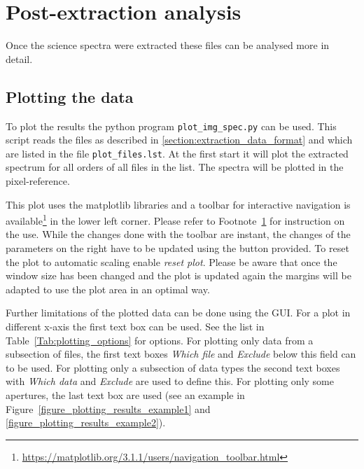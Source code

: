\documentclass[10pt,a4paper]{article}
\begin{document}

\newpage
\section{Post-extraction analysis}

\noindent Once the science spectra were extracted these files can be analysed more in detail. 

\subsection{Plotting the data}
\label{Section:Plotting_extracted_files}
To plot the results the python program \verb|plot_img_spec.py| can be used. This script reads the files as described in \ref{section:extraction_data_format} and which are listed in the file \verb|plot_files.lst|. At the first start it will plot the extracted spectrum for all orders of all files in the list. The spectra will be plotted in the pixel-reference.

This plot uses the matplotlib libraries and a toolbar for interactive navigation is available\footnote{\label{Footnote:matplotlib_toolbar} \url{https://matplotlib.org/3.1.1/users/navigation_toolbar.html}} in the lower left corner. Please refer to Footnote~\ref{Footnote:matplotlib_toolbar} for instruction on the use. While the changes done with the toolbar are instant, the changes of the parameters on the right have to be updated using the button provided. To reset the plot to automatic scaling enable \textit{reset plot}. Please be aware that once the window size has been changed and the plot is updated again the margins will be adapted to use the plot area in an optimal way.

Further limitations of the plotted data can be done using the GUI. For a plot in different x-axis the first text box can be used. See the list in Table~\ref{Tab:plotting_options} for options. For plotting only data from a subsection of files, the first text boxes \textit{Which file} and \textit{Exclude} below this field can to be used. For plotting only a subsection of data types the second text boxes with \textit{Which data} and \textit{Exclude} are used to define this. For plotting only some apertures, the last text box are used (see an example in Figure~\ref{figure_plotting_results_example1} and \ref{figure_plotting_results_example2}).
\end{document}
